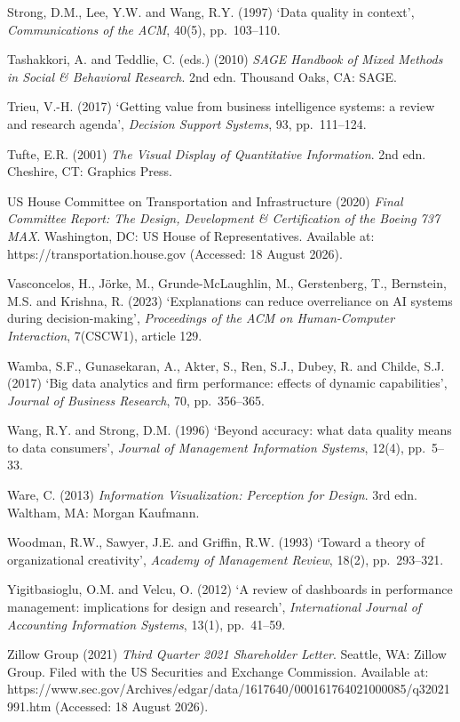 \documentclass[11pt,a4paper]{article}
\numberwithin{figure}{section}
\numberwithin{table}{section}
\newcommand{\ct}[1]{\textcolor{citeblue}{#1}}          %
\begin{document}
{Strong, D.M., Lee, Y.W. and Wang, R.Y. (1997) `Data quality in context', \emph{Communications of the
ACM}, 40(5), pp.~103--110.

Tashakkori, A. and Teddlie, C. (eds.) (2010) \emph{SAGE Handbook of Mixed Methods in Social \&
Behavioral Research}. 2nd edn. Thousand Oaks, CA: SAGE.

Trieu, V.-H. (2017) `Getting value from business intelligence systems: a review and research
agenda', \emph{Decision Support Systems}, 93, pp.~111--124.

Tufte, E.R. (2001) \emph{The Visual Display of Quantitative Information}. 2nd edn. Cheshire, CT:
Graphics Press.

US House Committee on Transportation and Infrastructure (2020) \emph{Final Committee Report: The
Design, Development \& Certification of the Boeing 737 MAX}. Washington, DC: US House of
Representatives. Available at: \ct{https://transportation.house.gov} (Accessed: 18 August 2026).

Vasconcelos, H., Jörke, M., Grunde-McLaughlin, M., Gerstenberg, T., Bernstein, M.S. and Krishna, R.
(2023) `Explanations can reduce overreliance on AI systems during decision-making',
\emph{Proceedings of the ACM on Human-Computer Interaction}, 7(CSCW1), article 129.

Wamba, S.F., Gunasekaran, A., Akter, S., Ren, S.J., Dubey, R. and Childe, S.J. (2017) `Big data
analytics and firm performance: effects of dynamic capabilities', \emph{Journal of Business
Research}, 70, pp.~356--365.

Wang, R.Y. and Strong, D.M. (1996) `Beyond accuracy: what data quality means to data consumers',
\emph{Journal of Management Information Systems}, 12(4), pp.~5--33.

Ware, C. (2013) \emph{Information Visualization: Perception for Design}. 3rd edn. Waltham, MA:
Morgan Kaufmann.

Woodman, R.W., Sawyer, J.E. and Griffin, R.W. (1993) `Toward a theory of organizational creativity',
\emph{Academy of Management Review}, 18(2), pp.~293--321.

Yigitbasioglu, O.M. and Velcu, O. (2012) `A review of dashboards in performance management:
implications for design and research', \emph{International Journal of Accounting Information
Systems}, 13(1), pp.~41--59.

Zillow Group (2021) \emph{Third Quarter 2021 Shareholder Letter}. Seattle, WA: Zillow Group. Filed
with the US Securities and Exchange Commission. Available at:
\ct{https://www.sec.gov/Archives/edgar/data/1617640/000161764021000085/q32021991.htm} (Accessed: 18
August 2026).
\par}
\end{document}
